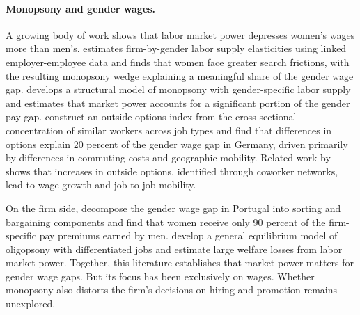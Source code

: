 \documentclass[11pt]{article}
\begin{document}
\paragraph{Monopsony and gender wages.}
A growing body of work shows that labor market power depresses women's wages more than men's. \citet{webber_firm-level_2016} estimates firm-by-gender labor supply elasticities using linked employer-employee data and finds that women face greater search frictions, with the resulting monopsony wedge explaining a meaningful share of the gender wage gap. \citet{sharma_monopsony_2023} develops a structural model of monopsony with gender-specific labor supply and estimates that market power accounts for a significant portion of the gender pay gap. \citet{caldwell_outside_nodate} construct an outside options index from the cross-sectional concentration of similar workers across job types and find that differences in options explain 20 percent of the gender wage gap in Germany, driven primarily by differences in commuting costs and geographic mobility. Related work by \citet{caldwell_outside_nodate-1} shows that increases in outside options, identified through coworker networks, lead to wage growth and job-to-job mobility.

On the firm side, \citet{card_bargaining_2016} decompose the gender wage gap in Portugal into sorting and bargaining components and find that women receive only 90 percent of the firm-specific pay premiums earned by men. \citet{berger_labor_2022} develop a general equilibrium model of oligopsony with differentiated jobs and estimate large welfare losses from labor market power. Together, this literature establishes that market power matters for gender wage gaps. But its focus has been exclusively on wages. Whether monopsony also distorts the firm's decisions on hiring and promotion remains unexplored.

\end{document}
